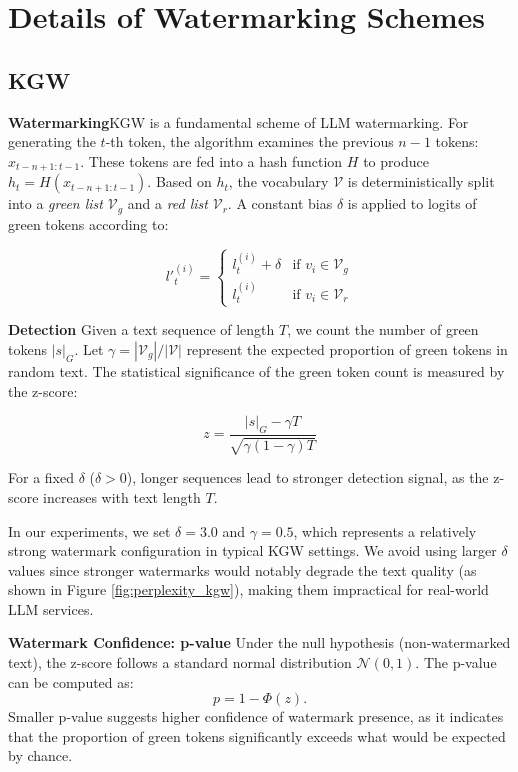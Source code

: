 \section{Details of Watermarking Schemes}
\label{sec:schemes}
\subsection{KGW}
\noindent\textbf{Watermarking}\quad KGW \cite{DBLP:conf/icml/KirchenbauerGWK23} is a fundamental scheme of LLM watermarking. For generating the $t$-th token, the algorithm examines the previous $n-1$ tokens: $x_{t-n+1:t-1}$. These tokens are fed into a hash function $H$ to produce $h_t = H(x_{t-n+1:t-1})$. Based on $h_t$, the vocabulary $\mathcal{V}$ is deterministically split into a \textit{green list} $\mathcal{V}_g$ and a \textit{red list} $\mathcal{V}_r$. A constant bias $\delta$ is applied to logits of green tokens according to:

\begin{equation}
{l'}_t^{(i)} = \begin{cases}
{l}_t^{(i)} + \delta & \text{if } v_i \in \mathcal{V}_g \\
{l}_t^{(i)} & \text{if } v_i \in \mathcal{V}_r
\end{cases}
\end{equation}

\noindent\textbf{Detection} \quad Given a text sequence of length $T$, we count the number of green tokens $|s|_G$. Let $\gamma = |\mathcal{V}_g|/|\mathcal{V}|$ represent the expected proportion of green tokens in random text. The statistical significance of the green token count is measured by the z-score:

\begin{equation}
z = \frac{|s|_G - \gamma T}{\sqrt{\gamma(1-\gamma)T}}
\end{equation}

For a fixed $\delta$ ($\delta > 0$), longer sequences lead to stronger detection signal, as the z-score increases with text length $T$. 

In our experiments, we set $\delta=3.0$ and $\gamma=0.5$, which represents a relatively strong watermark configuration in typical KGW settings. We avoid using larger $\delta$ values since stronger watermarks would notably degrade the text quality (as shown in Figure \ref{fig:perplexity_kgw}), making them impractical for real-world LLM services.

\noindent\textbf{Watermark Confidence: p-value} \quad Under the null hypothesis (non-watermarked text), the z-score follows a standard normal distribution $\mathcal{N}(0,1)$. The p-value can be computed as:
\begin{equation}
    p = 1-\Phi(z).
\end{equation}
Smaller p-value suggests higher confidence of watermark presence, as it indicates that the proportion of green tokens significantly exceeds what would be expected by chance.

